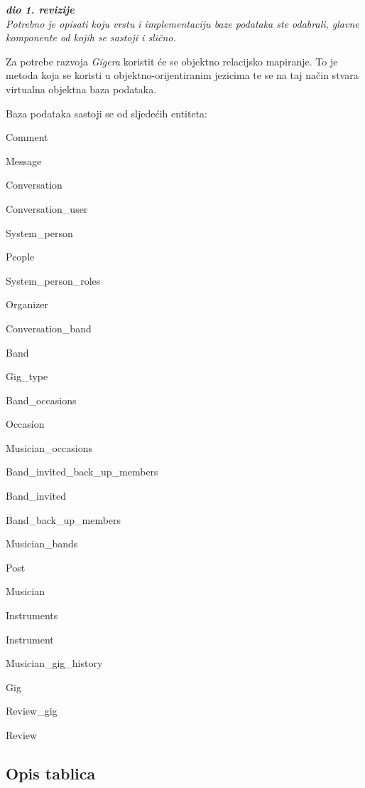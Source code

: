 			\textbf{\textit{dio 1. revizije}}\\
			
		\textit{Potrebno je opisati koju vrstu i implementaciju baze podataka ste odabrali, glavne komponente od kojih se sastoji i slično.}
		
		Za potrebe razvoja \textit{Gigera} koristit će se objektno relacijsko mapiranje. To je metoda koja se koristi u objektno-orijentiranim jezicima te se na taj način stvara virtualna objektna baza podataka.
		
		Baza podataka sastoji se od sljedećih entiteta:
		
		\begin{packed_item}
		\item Comment
		\item Message
		\item Conversation
		\item Conversation\_user
		\item System\_person
		\item People
		\item System\_person\_roles
		\item Organizer
		\item Conversation\_band
		\item Band
		\item Gig\_type
		\item Band\_occasions
		\item Occasion
		\item Musician\_occasions
		\item Band\_invited\_back\_up\_members
		\item Band\_invited
		\item Band\_back\_up\_members
		\item Musician\_bands
		\item Post
		\item Musician
		\item Instruments
		\item Instrument
		\item Musician\_gig\_history
		\item Gig
		\item Review\_gig
		\item Review
		
	\end{packed_item}
	
	
	
	\subsection{Opis tablica}
	
